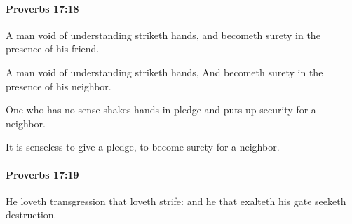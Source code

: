 		\paragraph{Proverbs 17:18} %
			\label{PROVERBS-17-18}

			A man void of understanding striketh hands, and becometh surety in the presence of his friend.

			\begin{versebox}
					\item[BHS] 
					\item[ASV] A man void of understanding striketh hands, And becometh surety in the presence of his neighbor.
					\item[NIV] One who has no sense shakes hands in pledge and puts up security for a neighbor.
					\item[NRSV] It is senseless to give a pledge, to become surety for a neighbor.
			\end{versebox}

		\paragraph{Proverbs 17:19} %
			\label{PROVERBS-17-19}

			He loveth transgression that loveth strife: and he that exalteth his gate seeketh destruction.

